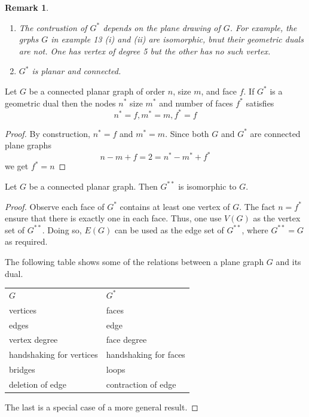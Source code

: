 \documentclass[12pt]{article}
\newenvironment{theorem}[1]{%
  \renewcommand\themanualtheoreminner{#1}%
  \manualtheoreminner
}{\endmanualtheoreminner}
\newenvironment{lemma}[1]{
  \renewcommand\thecustomlemma{#1}\customlemma
}{\endcustomlemma}
\newtheorem*{remark}{Remark}
\begin{document}
\begin{remark}\
	\begin{enumerate}
		\item The contrustion of $G^{*}$ depends on the plane drawing of $G$. For example, the grphs $G$ in example 13 (i) and (ii) are isomorphic, bnut their geometric duals are not.  One has vertex of degree 5 but the other has no such vertex.
		\item $G^{*}$ is planar and connected.
	\end{enumerate}
\end{remark}


\begin{lemma}{9}
	Let $G$ be a connected planar graph of order $n$, size $m$, and face $f$. If $G^{*}$ is a geometric dual then the nodes $n^{*}$ size $m^{*}$ and number of faces $f^{*}$ satisfies
	\[n^{*} = f, m^{*} = m, f^{*} =f\]
\end{lemma}

\begin{proof}
	By construction, $n^{*} = f$ and $m^{*} = m$. Since both $G$ and $G^{*}$ are connected plane graphs
	\[n-m+f = 2= n^{*}-m^{*}+f^{*}\]
	we get $f^{*} = n$
\end{proof}


\begin{theorem}{10}
	Let $G$ be a connected planar graph. Then $G^{**}$ is isomorphic to $G$.
\end{theorem}

\begin{proof}

	Observe each face of $G^{*}$ contains at least one vertex of $G$. The fact $n=f^{*}$ ensure that there is exactly one in each face.
	Thus, one use $V(G)$ as the vertex set of $G^{**}$.
	Doing so, $E(G)$ can be used as the edge set of $G^{**}$, where $G^{**} =G$ as required.

	The following table shows some of the relations between a plane graph $G$ and its dual.

	\begin{table}
		\centering
		\begin{tabular}{ll}
			$G$                      & $G^{*}$               \\
			vertices                 & faces                 \\
			edges                    & edge                  \\
			vertex degree            & face degree           \\
			handshaking for vertices & handshaking for faces \\
			bridges                  & loops                 \\
			deletion of edge         & contraction of edge
		\end{tabular}
	\end{table}
	The last is a special case of a more general result.
\end{proof}
\end{document}
